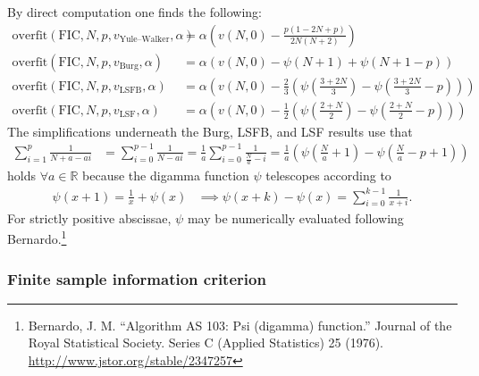 \documentclass[12pt,letterpaper]{article}
\begin{document}
By direct computation one finds the following:
\begin{subequations}
\begin{align}
    \text{overfit}\!\left(\text{FIC},N,p,v_\text{Yule--Walker},\alpha\right)
    &=
    \alpha\left(
      v\!\left(N,0\right)
    - \frac{p \left(1-2 N+p\right)}{2 N \left(N+2\right)}
    \right)
\\
    \text{overfit}\!\left(\text{FIC},N,p,v_\text{Burg},\alpha\right)
    &=
    \alpha\left(
      v\!\left(N,0\right)
    - \psi\!\left(N+1\right)
    + \psi\!\left(N+1-p\right)
    \right)
\\
    \text{overfit}\!\left(\text{FIC},N,p,v_\text{LSFB},\alpha\right)
    &=
    \alpha\left(
      v\!\left(N,0\right)
    - \frac{2}{3} \left(
            \psi\!\left(\frac{3+2N}{3}\right)
          - \psi\!\left(\frac{3+2N}{3}-p\right)
      \right)
    \right)
\\
    \text{overfit}\!\left(\text{FIC},N,p,v_\text{LSF},\alpha\right)
    &=
    \alpha\left(
      v\!\left(N,0\right)
    - \frac{1}{2} \left(
            \psi\!\left(\frac{2+N}{2}\right)
          - \psi\!\left(\frac{2+N}{2}-p\right)
      \right)
    \right)
\end{align}
\end{subequations}
The simplifications underneath the Burg, LSFB, and LSF results use that
\begin{align}
    \sum_{i=1}^{p} \frac{1}{N+a-ai}
    &=
    \sum_{i=0}^{p-1} \frac{1}{N-ai}
    =
    \frac{1}{a} \sum_{i=0}^{p-1} \frac{1}{\frac{N}{a}-i}
    =
    \frac{1}{a} \left(
          \psi\!\left(\frac{N}{a}+1\right)
        - \psi\!\left(\frac{N}{a}-p+1\right)
    \right)
\end{align}
holds $\forall{}a\in\mathbb{R}$ because the digamma function $\psi$
telescopes according to
\begin{align}
    \psi\!\left(x+1\right)
    =
    \frac{1}{x}
    +
    \psi\!\left(x\right)
    &\implies
    \psi\!\left(x+k\right)
    -
    \psi\!\left(x\right)
    =
    \sum_{i=0}^{k-1} \frac{1}{x + i}
    .
\end{align}
For strictly positive abscissae, $\psi$ may be numerically evaluated following
Bernardo.\footnote{Bernardo, J. M.  ``Algorithm AS 103: Psi (digamma)
function.'' Journal of the Royal Statistical Society.  Series C (Applied
Statistics) 25 (1976).  \url{http://www.jstor.org/stable/2347257}}

\subsubsection*{Finite sample information criterion}
\end{document}
